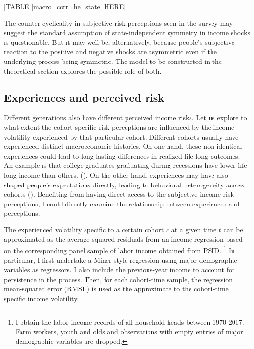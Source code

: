 \documentclass[12pt,notitlepage,onecolumn,aps,pra]{article}
\begin{document}
{[}TABLE \ref{macro_corr_he_state} HERE{]}

The counter-cyclicality in subjective risk perceptions seen in the
survey may suggest the standard assumption of state-independent symmetry
in income shocks is questionable. But it may well be, alternatively,
because people's subjective reaction to the positive and negative shocks
are asymmetric even if the underlying process being symmetric. The model
to be constructed in the theoretical section explores the possible role
of both.




    \hypertarget{experiences-and-perceived-risk}{%
\subsection{Experiences and perceived
risk}\label{experiences-and-perceived-risk}}

Different generations also have different perceived income risks. Let us
explore to what extent the cohort-specific risk perceptions are
influenced by the income volatility experienced by that particular
cohort. Different cohorts usually have experienced distinct
macroeconomic histories. On one hand, these non-identical experiences
could lead to long-lasting differences in realized life-long outcomes.
An example is that college graduates graduating during recessions have
lower life-long income than others. (\cite{oreopoulos2012short}). On the
other hand, experiences may have also shaped people's expectations
directly, leading to behavioral heterogeneity across cohorts
(\cite{malmendier2015learning}). Benefiting from having direct access to
the subjective income risk perceptions, I could directly examine the
relationship between experiences and perceptions.

The experienced volatility specific to a certain cohort \(c\) at a given
time \(t\) can be approximated as the average squared residuals from an
income regression based on the corresponding panel sample of labor
income obtained from PSID.
\footnote{I obtain the labor income records of all household heads between 1970-2017. Farm workers, youth and olds and observations with empty entries of major demographic variables are dropped.}
In particular, I first undertake a Miner-style regression using major
demographic variables as regressors. I also include the previous-year
income to account for persistence in the process. Then, for each
cohort-time sample, the regression mean-squared error (RMSE) is used as
the approximate to the cohort-time specific income volatility.
\end{document}
